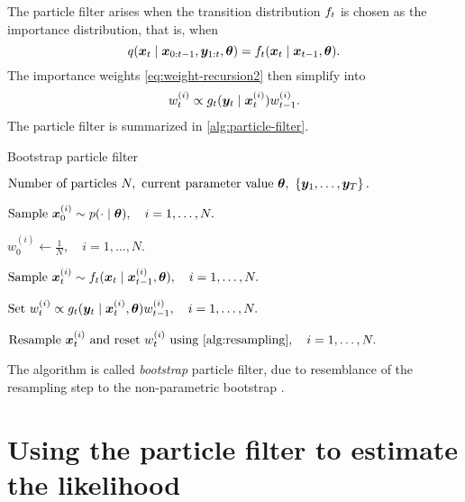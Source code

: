 The particle filter arises when the transition distribution $f_t$ is chosen as the importance distribution, that is, when
\begin{equation*}
q(\bm{x}_t \mid \bm{x}_{0:t-1}, \bm{y}_{1:t}, \bm{\theta}) = f_t(\bm{x}_t \mid \bm{x}_{t-1}, \bm{\theta}).
\end{equation*}
The importance weights \eqref{eq:weight-recursion2} then simplify into
\begin{equation} \label{eq:weight-recursion3}
w_t^{(i)} \propto g_t(\bm{y}_t \mid \bm{x}_t^{(i)}) w_{t-1}^{(i)}.
\end{equation}
The particle filter is summarized in \autoref{alg:particle-filter}.
\begin{algorithm}[ht]
    \caption{Bootstrap particle filter}
    \label{alg:particle-filter}
    \begin{algorithmic}[1]
        \Input $\text{Number of particles } N,\ \text{current parameter value } \btheta,\ \left\{\by_1, \ldots, \by_T\right\}.$
        
        \State $\text{Sample } \bm{x}_0^{(i)} \sim p(\cdot \mid \bm{\theta}), \quad i = 1, \ldots, N.$ 
        
        \State $w_0^{(i)} \gets \frac{1}{N}, \quad i = 1, \ldots, N.$ 
        
        \State $\text{Sample } \bm{x}_t^{(i)} \sim f_t(\bm{x}_t \mid \bm{x}_{t-1}^{(i)}, \bm{\theta}), \quad i = 1, \ldots, N.$ 
        
        \State $\text{Set } w_t^{(i)} \propto g_t(\bm{y}_t \mid \bm{x}_t^{(i)}, \bm{\theta}) w_{t-1}^{(i)}, \quad i = 1, \ldots, N.$ 
        
        \State $\text{Resample } \bx_t^{(i)} \text{ and reset } w_t^{(i)} \text{ using \autoref{alg:resampling}}, \quad i = 1, \ldots, N.$
        \EndFor
    \end{algorithmic}
\end{algorithm}
The algorithm is called \emph{bootstrap} particle filter, due to resemblance of the resampling step to the non-parametric bootstrap \citep{bootstrap}.



\section{Using the particle filter to estimate the likelihood} \label{sec:particle-filter-estimate}

